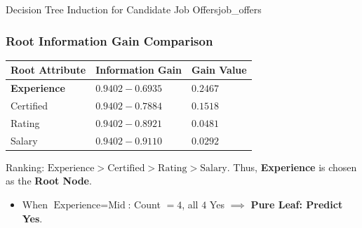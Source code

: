 \begin{example}{Decision Tree Induction for Candidate Job Offers}{job_offers}
\subsubsection{Root Information Gain Comparison}
\begin{center}\renewcommand{\arraystretch}{1.35}
\begin{tabular}{lll}
\toprule
\textbf{Root Attribute} & \textbf{Information Gain} & \textbf{Gain Value} \\
\midrule
\textbf{Experience} & $0.9402 - 0.6935$ & $\mathbf{0.2467}$ \\
Certified           & $0.9402 - 0.7884$ & $0.1518$ \\
Rating              & $0.9402 - 0.8921$ & $0.0481$ \\
Salary              & $0.9402 - 0.9110$ & $0.0292$ \\
\bottomrule
\end{tabular}
\end{center}
Ranking: $\text{Experience} > \text{Certified} > \text{Rating} > \text{Salary}$.
Thus, \textbf{Experience} is chosen as the \textbf{Root Node}.
\begin{itemize}
    \item When $\text{Experience} = \text{Mid}$: Count $= 4$, all $4$ Yes $\implies$ \textbf{Pure Leaf: Predict Yes}.
\end{itemize}


\end{example}
